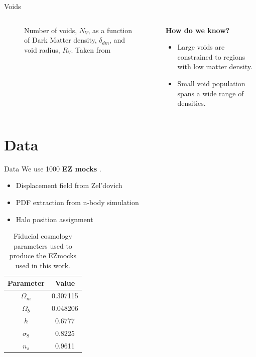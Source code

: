 \documentclass{beamer}
\begin{document}
\begin{frame}[allowframebreaks]{Voids}
\begin{columns}
\begin{column}{0.49\linewidth}
\begin{figure}
			\caption{Number of voids, $N_V$, as a function of Dark Matter density, $\delta_{dm}$, and void radius, $R_V$. Taken from \citep{Zhao2016}}
			\label{fig:radiusvsdensity}
		\end{figure}
	\end{column}
	\begin{column}{0.49\linewidth}
		\textbf{How do we know?}
		\begin{itemize}
			\item Large voids are constrained to regions with low matter density.
			\item Small void population spans a wide range of densities.
		\end{itemize}
	
	\end{column}
\end{columns}
\end{frame}
\section{Data}
\begin{frame}[allowframebreaks]{Data}
	We use 1000 \textbf{EZ mocks} \citet{Zhao2020}.
	\begin{itemize}
		\item Displacement field from Zel'dovich
		\item PDF extraction from n-body simulation
		\item Halo position assignment
	\end{itemize}
\begin{table}
	\centering
	\caption{Fiducial cosmology parameters used to produce the EZmocks used in this work.}
	\label{tab:fiducial}
	\begin{tabular}{cc}
		\hline
		Parameter & Value \\
		\hline
		$\Omega_m$ & 0.307115 \\
		$\Omega_b$ & 0.048206\\
		$h$ & 0.6777 \\
		$\sigma_8$ & 0.8225\\
		$n_s$ & 0.9611\\
		\hline
	\end{tabular}	
\end{table}
\end{frame}
\end{document}

